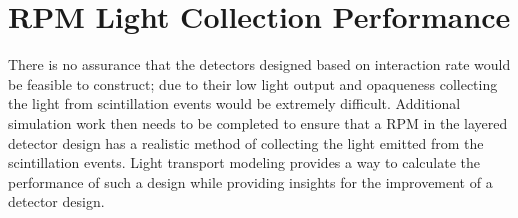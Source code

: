 \section{RPM Light Collection Performance}
\label{sec:RPMLCP}

There is no assurance that the detectors designed based on interaction rate would be feasible to construct; due to their low light output and opaqueness collecting the light from scintillation events would be extremely difficult.  
Additional simulation work then needs to be completed to ensure that a RPM in the layered detector design has a realistic method of collecting the light emitted from the scintillation events.
Light transport modeling provides a way to calculate the performance of such a design while providing insights for the improvement of a detector design.

